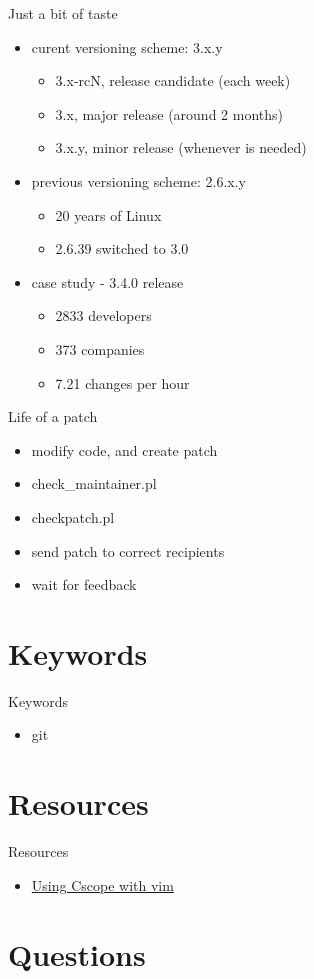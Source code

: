 \documentclass{workshop}
\begin{document}
\begin{frame}{Just a bit of taste}
\begin{itemize}
\item curent versioning scheme: 3.x.y
\begin{itemize}
\item 3.x-rcN, release candidate (each week)
\item 3.x, major release (around 2 months)
\item 3.x.y, minor release (whenever is needed)
\end{itemize}
\item previous versioning scheme: 2.6.x.y
\begin{itemize}
\item 20 years of Linux
\item 2.6.39 switched to 3.0
\end{itemize}
\item case study - 3.4.0 release
\begin{itemize}
\item 2833 developers
\item 373 companies
\item 7.21 changes per hour
\end{itemize}
\end{itemize}
\end{frame}

\begin{frame}{Life of a patch}
\begin{itemize}
\item modify code, and create patch
\item check_maintainer.pl
\item checkpatch.pl
\item send patch to correct recipients
\item wait for feedback
\end{itemize}
\end{frame}



\section{Keywords}

\begin{frame}{Keywords}
     \begin{itemize}
	\item git
      \end{itemize}
\end{frame}

\section{Resources}
\begin{frame}{Resources}
  \begin{itemize}
  \item \href{http://cscope.sourceforge.net/cscope_vim_tutorial.html}{Using Cscope with vim}
  \end{itemize}
\end{frame}

\section{Questions}
\end{document}
